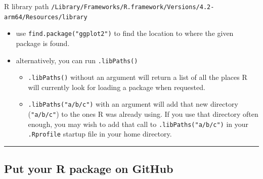 \documentclass[
]{book}
\newenvironment{Shaded}{\begin{snugshade}}{\end{snugshade}}
\newcommand{\AttributeTok}[1]{\textcolor[rgb]{0.13,0.29,0.53}{#1}}
\newcommand{\CommentTok}[1]{\textcolor[rgb]{0.56,0.35,0.01}{\textit{#1}}}
\newcommand{\ConstantTok}[1]{\textcolor[rgb]{0.56,0.35,0.01}{#1}}
\newcommand{\DecValTok}[1]{\textcolor[rgb]{0.00,0.00,0.81}{#1}}
\newcommand{\DocumentationTok}[1]{\textcolor[rgb]{0.56,0.35,0.01}{\textbf{\textit{#1}}}}
\newcommand{\FunctionTok}[1]{\textcolor[rgb]{0.13,0.29,0.53}{\textbf{#1}}}
\newcommand{\NormalTok}[1]{#1}
\newcommand{\OtherTok}[1]{\textcolor[rgb]{0.56,0.35,0.01}{#1}}
\newcommand{\SpecialCharTok}[1]{\textcolor[rgb]{0.81,0.36,0.00}{\textbf{#1}}}
\newcommand{\StringTok}[1]{\textcolor[rgb]{0.31,0.60,0.02}{#1}}
\providecommand{\tightlist}{%
  \setlength{\itemsep}{0pt}\setlength{\parskip}{0pt}}
\theoremstyle{definition}
\theoremstyle{definition}
\theoremstyle{definition}
\theoremstyle{definition}
\theoremstyle{remark}
\begin{document}
\begin{Shaded}
\end{Shaded}

R library path \texttt{/Library/Frameworks/R.framework/Versions/4.2-arm64/Resources/library}

\begin{itemize}
\tightlist
\item
  use \texttt{find.package("ggplot2")} to find the location to where the given package is found.
\item
  alternatively, you can run \texttt{.libPaths()}

  \begin{itemize}
  \tightlist
  \item
    \texttt{.libPaths()} without an argument will return a list of all the places R will currently look for loading a package when requested.
  \item
    \texttt{.libPaths("a/b/c")} with an argument will add that new directory (\texttt{"a/b/c"}) to the ones R was already using. If you use that directory often enough, you may wish to add that call to \texttt{.libPaths("a/b/c")} in your \texttt{.Rprofile} startup file in your home directory.
  \end{itemize}
\end{itemize}

\begin{center}\rule{0.5\linewidth}{0.5pt}\end{center}

\subsection*{Put your R package on GitHub}\label{put-your-r-package-on-github}
\end{document}

